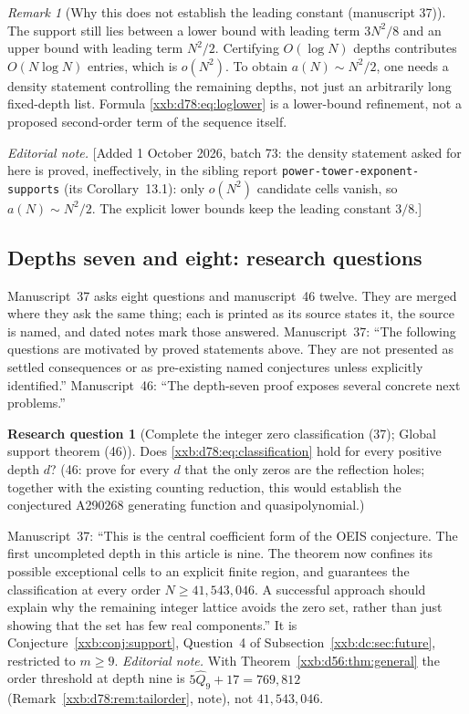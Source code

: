 \documentclass[11pt,a4paper]{article}
\numberwithin{equation}{section}
\theoremstyle{definition}
\newtheorem{question}[theorem]{Research question}
\theoremstyle{remark}
\newtheorem{remark}[theorem]{Remark}
\theoremstyle{plain}
\newcommand{\sibPTE}{\texttt{power-\allowbreak{}tower-\allowbreak{}exponent-\allowbreak{}supports}}
\begin{document}
\begin{remark}[Why this does not establish the leading constant (manuscript 37)]\label{xxb:d78:rem:constant}
The support still lies between a lower bound with leading term $3N^2/8$ and an
upper bound with leading term $N^2/2$.  Certifying $O(\log N)$ depths
contributes $O(N\log N)$ entries, which is $o(N^2)$.  To obtain
$a(N)\sim N^2/2$, one needs a density statement controlling the remaining
depths, not just an arbitrarily long fixed-depth list.  Formula
\eqref{xxb:d78:eq:loglower} is a lower-bound refinement, not a proposed
second-order term of the sequence itself.
\end{remark}
\emph{Editorial note.}  [Added 1 October 2026, batch 73: the density statement
asked for here is proved, ineffectively, in the sibling report \sibPTE{} (its
Corollary~13.1): only $o(N^2)$ candidate cells vanish, so $a(N)\sim N^2/2$.
The explicit lower bounds keep the leading constant $3/8$.]

\subsection{Depths seven and eight: research questions}\label{xxb:d78:sec:questions}

Manuscript~37 asks eight questions and manuscript~46 twelve.  They are merged
where they ask the same thing; each is printed as its source states it, the
source is named, and dated notes mark those answered.  Manuscript~37: ``The
following questions are motivated by proved statements above. They are not
presented as settled consequences or as pre-existing named conjectures unless
explicitly identified.''  Manuscript~46: ``The depth-seven proof exposes
several concrete next problems.''

\begin{question}[Complete the integer zero classification (37); Global support theorem (46)]\label{xxb:d78:q:all}
Does \eqref{xxb:d78:eq:classification} hold for every positive depth $d$?
(46: prove for every $d$ that the only zeros are the reflection holes;
together with the existing counting reduction, this would establish the
conjectured A290268 generating function and quasipolynomial.)
\end{question}
Manuscript~37: ``This is the central coefficient form of the OEIS conjecture.
The first uncompleted depth in this article is nine. The theorem now confines
its possible exceptional cells to an explicit finite region, and guarantees the
classification at every order $N\ge41,543,046$. A successful approach should
explain why the remaining integer lattice avoids the zero set, rather than just
showing that the set has few real components.''  It is
Conjecture~\ref{xxb:conj:support}, Question~4 of
Subsection~\ref{xxb:dc:sec:future}, restricted to $m\ge9$.
\emph{Editorial note.}  With Theorem~\ref{xxb:d56:thm:general} the order
threshold at depth nine is $5\widehat Q_9+17=769{,}812$
(Remark~\ref{xxb:d78:rem:tailorder}, note), not $41{,}543{,}046$.
\end{document}
